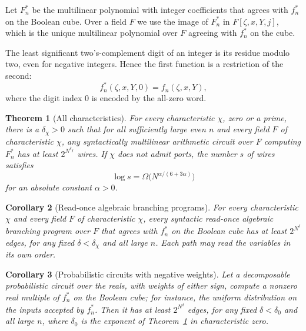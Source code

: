 \documentclass[11pt]{article}
\newtheorem{theorem}{Theorem}
\newtheorem{corollary}[theorem]{Corollary}
\theoremstyle{remark}
\begin{document}
Let \(F^*_n\) be the multilinear polynomial with integer coefficients
that agrees with \(f^*_n\) on the Boolean cube. Over a field \(F\) we use
the image of \(F^*_n\) in \(F[\zeta,x,Y,j]\), which is the unique
multilinear polynomial over \(F\) agreeing with \(f^*_n\) on the cube.

The least significant two's-complement digit of an integer is its residue
modulo two, even for negative integers. Hence the first function is a
restriction of the second:
\begin{equation}\label{eq:restrict}
 f^*_n(\zeta,x,Y,0)=f_n(\zeta,x,Y),
\end{equation}
where the digit index \(0\) is encoded by the all-zero word.

\begin{theorem}[All characteristics]\label{thm:all}
For every characteristic \(\chi\), zero or a prime, there is a
\(\delta_\chi>0\) such that for all sufficiently large even \(n\) and
every field \(F\) of characteristic \(\chi\), any syntactically
multilinear arithmetic circuit over \(F\) computing \(F^*_n\) has at least
\(2^{N^{\delta_\chi}}\) wires. If \(\chi\) does not admit ports, the
number \(s\) of wires satisfies
\begin{equation}\label{eq:all-quant}
 \log s=\Omega\bigl(N^{\alpha/(6+3\alpha)}\bigr)
\end{equation}
for an absolute constant \(\alpha>0\).
\end{theorem}

\begin{corollary}[Read-once algebraic branching programs]\label{cor:abp}
For every characteristic \(\chi\) and every field \(F\) of characteristic
\(\chi\), every syntactic read-once algebraic branching program over
\(F\) that agrees with \(f^*_n\) on the Boolean cube has at least
\(2^{N^{\delta}}\) edges, for any fixed \(\delta<\delta_\chi\) and all
large \(n\). Each path may read the variables in its own order.
\end{corollary}

\begin{corollary}[Probabilistic circuits with negative weights]\label{cor:pc}
Let a decomposable probabilistic circuit over the reals, with weights of
either sign, compute a nonzero real multiple of \(f^*_n\) on the Boolean
cube; for instance, the uniform distribution on the inputs accepted by
\(f^*_n\). Then it has at least \(2^{N^{\delta}}\) edges, for any fixed
\(\delta<\delta_0\) and all large \(n\), where \(\delta_0\) is the
exponent of Theorem~\ref{thm:all} in characteristic zero.
\end{corollary}
\end{document}
